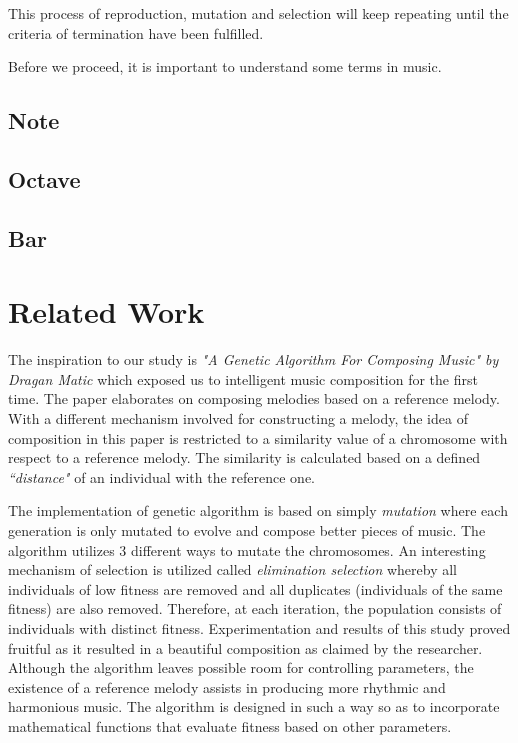 \documentclass[conference]{IEEEtran}
\begin{document}
This process of reproduction, mutation and selection will keep repeating until the criteria of termination have been fulfilled.

Before we proceed, it is important to understand some terms in music.

\subsection{Note}

\subsection{Octave}

\subsection{Bar}

\section{Related Work}
The inspiration to our study is \textit{"A Genetic Algorithm For Composing Music" by Dragan Matic} \cite{b1} which exposed us to intelligent music composition for the first time. The paper elaborates on composing melodies based on a reference melody. With a different mechanism involved for constructing a melody, the idea of composition in this paper is restricted to a similarity value of a chromosome with respect to a reference melody. The similarity is calculated based on a defined \textit{``distance"} of an individual with the reference one.

The implementation of genetic algorithm is based on simply \textit{mutation} where each generation is only mutated to evolve and compose better pieces of music. The algorithm utilizes 3 different ways to mutate the chromosomes. An interesting mechanism of selection is utilized called \textit{elimination selection} whereby all individuals of low fitness are removed and all duplicates (individuals of the same fitness) are also removed. Therefore, at each iteration, the population consists of individuals with distinct fitness. Experimentation and results of this study proved fruitful as it resulted in a beautiful composition as claimed by the researcher. Although the algorithm leaves possible room for controlling parameters, the existence of a reference melody assists in producing more rhythmic and harmonious music. The algorithm is designed in such a way so as to incorporate mathematical functions that evaluate fitness based on other parameters.
\end{document}
